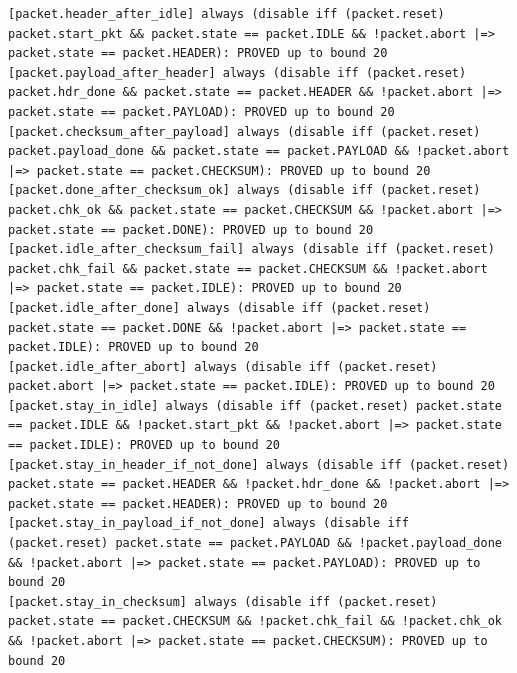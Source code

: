 \documentclass{article}
\begin{document}
\begin{lstlisting}
[packet.header_after_idle] always (disable iff (packet.reset) packet.start_pkt && packet.state == packet.IDLE && !packet.abort |=> packet.state == packet.HEADER): PROVED up to bound 20
[packet.payload_after_header] always (disable iff (packet.reset) packet.hdr_done && packet.state == packet.HEADER && !packet.abort |=> packet.state == packet.PAYLOAD): PROVED up to bound 20
[packet.checksum_after_payload] always (disable iff (packet.reset) packet.payload_done && packet.state == packet.PAYLOAD && !packet.abort |=> packet.state == packet.CHECKSUM): PROVED up to bound 20
[packet.done_after_checksum_ok] always (disable iff (packet.reset) packet.chk_ok && packet.state == packet.CHECKSUM && !packet.abort |=> packet.state == packet.DONE): PROVED up to bound 20
[packet.idle_after_checksum_fail] always (disable iff (packet.reset) packet.chk_fail && packet.state == packet.CHECKSUM && !packet.abort |=> packet.state == packet.IDLE): PROVED up to bound 20
[packet.idle_after_done] always (disable iff (packet.reset) packet.state == packet.DONE && !packet.abort |=> packet.state == packet.IDLE): PROVED up to bound 20
[packet.idle_after_abort] always (disable iff (packet.reset) packet.abort |=> packet.state == packet.IDLE): PROVED up to bound 20
[packet.stay_in_idle] always (disable iff (packet.reset) packet.state == packet.IDLE && !packet.start_pkt && !packet.abort |=> packet.state == packet.IDLE): PROVED up to bound 20
[packet.stay_in_header_if_not_done] always (disable iff (packet.reset) packet.state == packet.HEADER && !packet.hdr_done && !packet.abort |=> packet.state == packet.HEADER): PROVED up to bound 20
[packet.stay_in_payload_if_not_done] always (disable iff (packet.reset) packet.state == packet.PAYLOAD && !packet.payload_done && !packet.abort |=> packet.state == packet.PAYLOAD): PROVED up to bound 20
[packet.stay_in_checksum] always (disable iff (packet.reset) packet.state == packet.CHECKSUM && !packet.chk_fail && !packet.chk_ok && !packet.abort |=> packet.state == packet.CHECKSUM): PROVED up to bound 20
\end{lstlisting}
\end{document}
